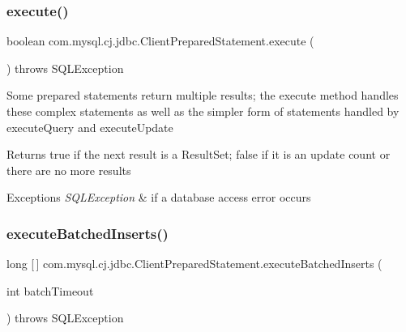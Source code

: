 \mbox{\label{classcom_1_1mysql_1_1cj_1_1jdbc_1_1_client_prepared_statement_aa56b43407e27aeea76e689e2663014e2}} 
\subsubsection{\texorpdfstring{execute()}{execute()}}
{\footnotesize\ttfamily boolean com.\+mysql.\+cj.\+jdbc.\+Client\+Prepared\+Statement.\+execute (\begin{DoxyParamCaption}{ }\end{DoxyParamCaption}) throws S\+Q\+L\+Exception}

Some prepared statements return multiple results; the execute method handles these complex statements as well as the simpler form of statements handled by execute\+Query and execute\+Update

\begin{DoxyReturn}{Returns}
true if the next result is a Result\+Set; false if it is an update count or there are no more results
\end{DoxyReturn}

\begin{DoxyExceptions}{Exceptions}
{\em S\+Q\+L\+Exception} & if a database access error occurs \\
\hline
\end{DoxyExceptions}
\mbox{\label{classcom_1_1mysql_1_1cj_1_1jdbc_1_1_client_prepared_statement_ad47127dbf61bdfd31b8e0230e8421616}} 
\subsubsection{\texorpdfstring{execute\+Batched\+Inserts()}{executeBatchedInserts()}}
{\footnotesize\ttfamily long \mbox{[}$\,$\mbox{]} com.\+mysql.\+cj.\+jdbc.\+Client\+Prepared\+Statement.\+execute\+Batched\+Inserts (\begin{DoxyParamCaption}\item[{int}]{batch\+Timeout }\end{DoxyParamCaption}) throws S\+Q\+L\+Exception\hspace{0.3cm}{\ttfamily [protected]}}

